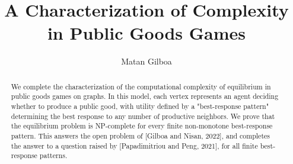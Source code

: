 \documentclass[runningheads]{llncs}
\begin{document}
\title{A Characterization of Complexity in Public Goods Games}

\author{Matan Gilboa}


%


\maketitle %
%
\begin{abstract}
We complete the characterization of the computational complexity of equilibrium in public goods games on graphs. In this model, each vertex represents an agent deciding whether to produce a public good, with utility defined by a "best-response pattern" determining the best response to any number of productive neighbors. We prove that the equilibrium problem is NP-complete for every finite non-monotone best-response pattern. This answers the open problem of [Gilboa and Nisan, 2022], and completes the answer to a question raised by [Papadimitriou and Peng, 2021], for all finite best-response patterns.

\end{abstract}
\end{document}
